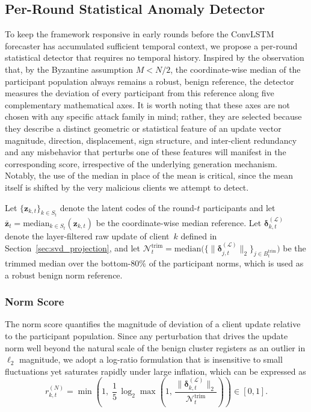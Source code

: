 \documentclass[journal]{IEEEtran}
\begin{document}
\subsection{Per-Round Statistical Anomaly Detector}
\label{sec:stat_detector}

To keep the framework responsive in early rounds before the ConvLSTM forecaster has accumulated sufficient temporal context, we propose a per-round statistical detector that requires no temporal history. Inspired by the observation that, by the Byzantine assumption $M < N/2$, the coordinate-wise median of the participant population always remains a robust, benign reference, the detector measures the deviation of every participant from this reference along five complementary mathematical axes. It is worth noting that these axes are not chosen with any specific attack family in mind; rather, they are selected because they describe a distinct geometric or statistical feature of an update vector magnitude, direction, displacement, sign structure, and inter-client redundancy and any misbehavior that perturbs one of these features will manifest in the corresponding score, irrespective of the underlying generation mechanism. Notably, the use of the median in place of the mean is critical, since the mean itself is shifted by the very malicious clients we attempt to detect.

Let $\{\mathbf{z}_{k,t}\}_{k\in S_t}$ denote the latent codes of the round-$t$ participants and let $\bar{\mathbf{z}}_t = \mathrm{median}_{k \in S_t}(\mathbf{z}_{k,t})$ be the coordinate-wise median reference. Let $\boldsymbol{\delta}_{k,t}^{(\mathcal{L})}$ denote the layer-filtered raw update of client~$k$ defined in Section~\ref{sec:svd_projection}, and let $\mathcal{N}_t^{\mathrm{trim}} = \mathrm{median}\bigl(\bigl\{\|\boldsymbol{\delta}_{j,t}^{(\mathcal{L})}\|_2\bigr\}_{j \in B_t^{\mathrm{trim}}}\bigr)$ be the trimmed median over the bottom-$80\%$ of the participant norms, which is used as a robust benign norm reference.

\subsubsection{Norm Score}
The norm score quantifies the magnitude of deviation of a client update relative to the participant population. Since any perturbation that drives the update norm well beyond the natural scale of the benign cluster registers as an outlier in $\ell_2$ magnitude, we adopt a log-ratio formulation that is insensitive to small fluctuations yet saturates rapidly under large inflation, which can be expressed as
\begin{equation}
r_{k,t}^{(N)} = \min\!\left(1,\; \frac{1}{5}\,\log_2\max\!\left(1,\, \frac{\|\boldsymbol{\delta}_{k,t}^{(\mathcal{L})}\|_2}{\mathcal{N}_t^{\mathrm{trim}}}\right)\right) \in [0,1].
\label{eq:norm_score}
\end{equation}
\end{document}

